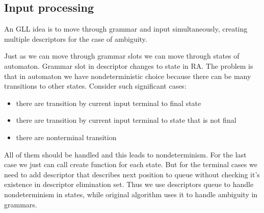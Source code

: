 \documentclass[runningheads,a4paper]{llncs}
\begin{document}


\subsection{Input processing}%
An GLL idea is to move through grammar and input simultaneously,
creating multiple descriptors for the case of ambiguity.

Just as we can move through grammar slots we can move through states 
of automaton. Grammar slot in descriptor changes to state in RA.
The problem is that in automaton we have nondeterministic choice because there can be 
many transitions to other states. Consider such significant cases:
\begin{itemize} 
\item there are transition by current input terminal to final state
\item there are transition by current input terminal to state that is not final
\item there are nonterminal transition
\end{itemize}
All of them should be handled and this leads to nondeterminism. 
For the last case we just can call create function for each state.
But for the terminal cases we need to add descriptor that describes
next position to queue without checking it's existence in descriptor elimination set.
Thus we use descriptors queue to handle nondeterminism in states, while original algorithm uses it to 
handle ambiguity in grammars.

\end{document}
